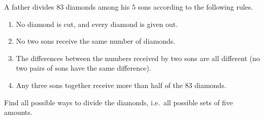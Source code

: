 A father divides $83$ diamonds among his $5$ sons according to the following rules.
\begin{enumerate}
\item No diamond is cut, and every diamond is given out.
\item No two sons receive the same number of diamonds.
\item The differences between the numbers received by two sons are all different (no two pairs of sons have the same difference).
\item Any three sons together receive more than half of the $83$ diamonds.
\end{enumerate}
Find all possible ways to divide the diamonds, i.e.\ all possible sets of five amounts.
